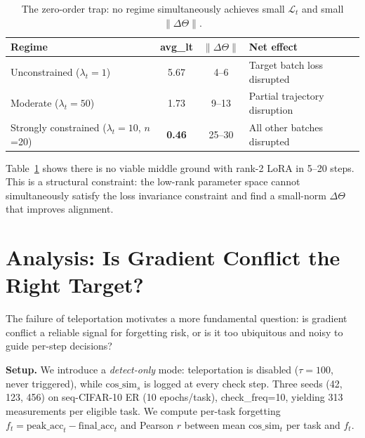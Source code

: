 \documentclass[11pt,a4paper]{article}
\newcommand{\toprule}{\hline\hline}
\newcommand{\midrule}{\hline}
\newcommand{\bottomrule}{\hline\hline}
\newcommand{\cossim}{\mathrm{cos\_sim}}
\begin{document}
\begin{table}[h]
\centering
\caption{The zero-order trap: no regime simultaneously achieves small $\mathcal{L}_t$ and small $\|\Delta\Theta\|$.}
\label{tab:trap}
\begin{tabular}{|l|c|c|l|}
\toprule
Regime & avg\_lt & $\|\Delta\Theta\|$ & Net effect \\
\midrule
Unconstrained ($\lambda_t=1$)          & 5.67 & 4--6   & Target batch loss disrupted \\
Moderate ($\lambda_t=50$)              & 1.73 & 9--13  & Partial trajectory disruption \\
Strongly constrained ($\lambda_t=10$, $n$=20) & \textbf{0.46} & 25--30 & All other batches disrupted \\
\bottomrule
\end{tabular}
\end{table}

Table~\ref{tab:trap} shows there is no viable middle ground with rank-2 LoRA in 5--20 steps.
This is a structural constraint: the low-rank parameter space cannot simultaneously satisfy
the loss invariance constraint and find a small-norm $\Delta\Theta$ that improves alignment.

\section{Analysis: Is Gradient Conflict the Right Target?}
\label{sec:h8}

The failure of teleportation motivates a more fundamental question: is gradient conflict
a reliable signal for forgetting risk, or is it too ubiquitous and noisy to guide per-step decisions?

\textbf{Setup.}
We introduce a \emph{detect-only} mode: teleportation is disabled ($\tau=100$, never triggered),
while $\cossim_s$ is logged at every check step.
Three seeds (42, 123, 456) on seq-CIFAR-10 ER (10 epochs/task), check\_freq=10,
yielding 313 measurements per eligible task.
We compute per-task forgetting $f_t = \text{peak\_acc}_t - \text{final\_acc}_t$ and
Pearson $r$ between mean $\cossim_t$ per task and $f_t$.
\end{document}
